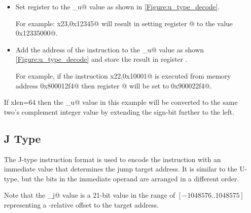 \begin{itemize}
\item{}
\label{insn:lui}

Set register \verb@rd@ to the \verb@imm_u@ value as shown in \autoref{Figure:u_type_decode}.  

For example: \verb@lui x23,0x12345@ will result in setting register @ to 
the value \verb@0x12335000@.

\item{}
\label{insn:auipc}

Add the address of the instruction to the \verb@imm_u@ value as 
shown \autoref{Figure:u_type_decode} and store the result in register \verb@rd@.

For example, if the instruction \verb@auipc x22,0x10001@ is executed from
memory address \verb@0x800012f4@ then register @ will be set to 
\verb@0x900022f4@.
\end{itemize}


If \Gls{xlen}=64 then the \verb@imm_u@ value in this example will be converted 
to the same two's complement integer value by extending the sign-bit 
further to the left.




\subsection{J Type}
\label{insnformat:jtype}

The J-type instruction format is used to encode the \verb@jal@ instruction 
with an immediate value that determines the jump target address.
It is similar to the U-type, but the bits in the immediate operand are 
arranged in a different order.


Note that the \verb@imm_j@ value is 
a 21-bit value in the range of 
$[-1048576..1048575]$ representing a \verb@pc@-relative offset to the 
target address. 


